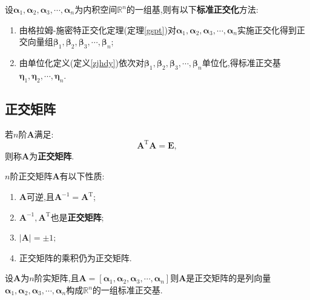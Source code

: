 \documentclass[9pt,a4paper]{book}
\begin{document}
\begin{method}[标准正交化的方法]
	设$\bm{\alpha}_{1},\bm{\alpha}_{2},\bm{\alpha}_{3},\cdots,\bm{\alpha}_{n} $为内积空间$ \mathbb{R}^n $的一组基,则有以下\textbf{标准正交化}方法:
	\begin{enumerate}
		\item 由格拉姆-施密特正交化定理(定理\ref{gspt})对$\bm{\alpha}_{1},\bm{\alpha}_{2},\bm{\alpha}_{3},\cdots,\bm{\alpha}_{n} $实施正交化得到正交向量组$ \bm{\beta}_{1},\bm{\beta}_{2},\bm{\beta}_{3},\cdots,\bm{\beta}_{n} $;
		\item 由单位化定义(定义\ref{zjhdy})依次对$ \bm{\beta}_{1},\bm{\beta}_{2},\bm{\beta}_{3},\cdots,\bm{\beta}_{n} $单位化,得标准正交基$ \bm{\eta}_1,\bm{\eta}_2,\cdots,\bm{\eta}_n $.
	\end{enumerate}
\end{method}


\subsection{正交矩阵}
\begin{defination}[正交矩阵的定义]
	若$ n $阶$ \bm{A} $满足:\[ \bm{A}^{\mathrm{T}}\bm{A}=\bm{E} ,\]则称$ \bm{A} $为\textbf{正交矩阵}.
\end{defination}
\begin{feature}[正交矩阵的性质]
	$ n $阶正交矩阵$ \bm{A} $有以下性质:
	\begin{enumerate}
		\item $ \bm{A} $可逆,且$ \bm{A}^{-1}=\bm{A}^{\mathrm{T}} $;
		\item$ \bm{A}^{-1},\bm{A}^{\mathrm{T}} $也是\textbf{正交矩阵};
		\item $ |\bm{A}|=\pm1; $
		\item 正交矩阵的乘积仍为正交矩阵.
	\end{enumerate}
\end{feature}
\begin{theorem}[正交矩阵构造定理]
	设$ \bm{A} $为$ n $阶实矩阵,且$ \bm{A}=[\bm{\alpha}_{1},\bm{\alpha}_{2},\bm{\alpha}_{3},\cdots,\bm{\alpha}_{n}]  $则$  \bm{A} $是正交矩阵的是列向量$ \bm{\alpha}_{1},\bm{\alpha}_{2},\bm{\alpha}_{3},\cdots,\bm{\alpha}_{n} $构成$ \mathbb{R}^n $的一组标准正交基.
\end{theorem}
\end{document}
